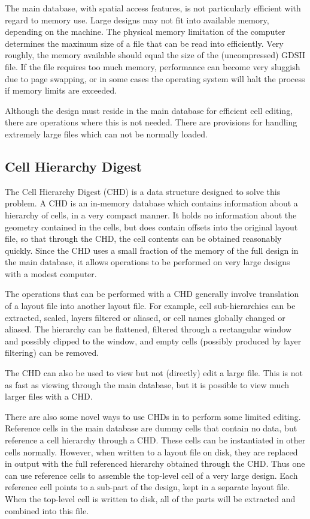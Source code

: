 The main database, with spatial access features, is not particularly
efficient with regard to memory use.  Large designs may not fit into
available memory, depending on the machine.  The physical memory
limitation of the computer determines the maximum size of a file that
can be read into {\Xic} efficiently.  Very roughly, the memory
available should equal the size of the (uncompressed) GDSII file.  If
the file requires too much memory, {\Xic} performance can become very
sluggish due to page swapping, or in some cases the operating system
will halt the process if memory limits are exceeded.

Although the design must reside in the main database for efficient
cell editing, there are operations where this is not needed.  There
are provisions for handling extremely large files which can not be
normally loaded.

\subsection{Cell Hierarchy Digest}

The Cell Hierarchy Digest (CHD) is a data structure designed to solve
this problem.  A CHD is an in-memory database which contains
information about a hierarchy of cells, in a very compact manner.  It
holds no information about the geometry contained in the cells, but
does contain offsets into the original layout file, so that through
the CHD, the cell contents can be obtained reasonably quickly.  Since
the CHD uses a small fraction of the memory of the full design in the
main database, it allows operations to be performed on very large
designs with a modest computer.

The operations that can be performed with a CHD generally involve
translation of a layout file into another layout file.  For example,
cell sub-hierarchies can be extracted, scaled, layers filtered or
aliased, or cell names globally changed or aliased.  The hierarchy can
be flattened, filtered through a rectangular window and possibly
clipped to the window, and empty cells (possibly produced by layer
filtering) can be removed.

The CHD can also be used to view but not (directly) edit a large file. 
This is not as fast as viewing through the main database, but it is
possible to view much larger files with a CHD.

There are also some novel ways to use CHDs in {\Xic} to perform some
limited editing.  Reference cells in the main database are dummy cells
that contain no data, but reference a cell hierarchy through a CHD. 
These cells can be instantiated in other cells normally.  However,
when written to a layout file on disk, they are replaced in output
with the full referenced hierarchy obtained through the CHD.  Thus one
can use reference cells to assemble the top-level cell of a very large
design.  Each reference cell points to a sub-part of the design, kept
in a separate layout file.  When the top-level cell is written to
disk, all of the parts will be extracted and combined into this file.

